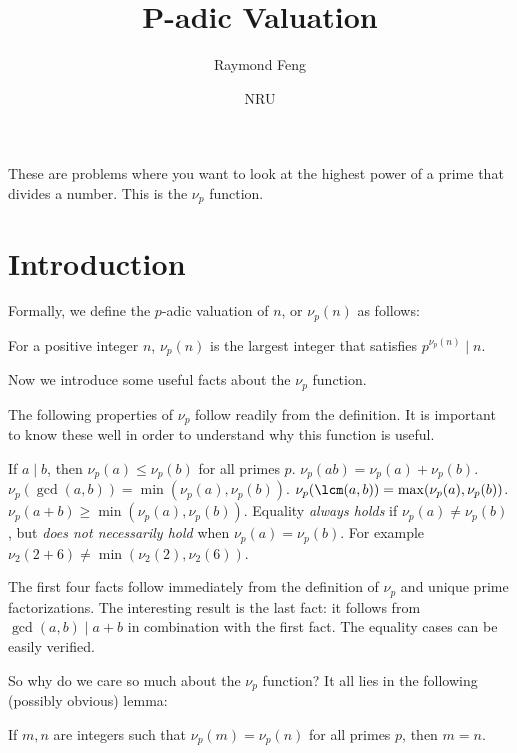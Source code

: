 \documentclass{article}
\title{P-adic Valuation}
\author{Raymond Feng}
\date{NRU}
\begin{document}
\maketitle

These are problems where you want to look at the highest power of a prime that divides a number. This is the $\nu_p$ function. 

\section{Introduction}
Formally, we define the $p$-adic valuation of $n$, or $\nu_p(n)$ as follows:
\begin{defi}
    For a positive integer $n$, $\nu_p(n)$ is the largest integer that satisfies $p^{\nu_p(n)}\mid n$.
\end{defi}

Now we introduce some useful facts about the $\nu_p$ function.

\begin{fact}[Properties of $\nu_p$]
    The following properties of $\nu_p$ follow readily from the definition. It is important to know these well in order to understand why this function is useful.
    \begin{itemize}
        \Item If $a\mid b$, then $\nu_p(a)\leq\nu_p(b)$ for all primes $p$.
        \Item $\nu_p(ab)=\nu_p(a)+\nu_p(b)$.
        \Item $\nu_p(\gcd(a,b))=\min(\nu_p(a),\nu_p(b))$.
        \Item $\nu_p(\lcm(a,b))=\max(\nu_p(a),\nu_p(b))$.
        \Item $\nu_p(a+b)\geq\min(\nu_p(a),\nu_p(b))$. Equality \emph{always holds} if $\nu_p(a)\neq\nu_p(b)$, but \emph{does not necessarily hold} when $\nu_p(a)=\nu_p(b)$. For example $\nu_2(2+6)\neq\min(\nu_2(2),\nu_2(6))$.
    \end{itemize}
\end{fact}

\begin{pro}
    The first four facts follow immediately from the definition of $\nu_p$ and unique prime factorizations. The interesting result is the last fact: it follows from $\gcd(a,b)\mid a+b$ in combination with the first fact. The equality cases can be easily verified.
\end{pro}

So why do we care so much about the $\nu_p$ function? It all lies in the following (possibly obvious) lemma:

\begin{lemma}
    If $m,n$ are integers such that $\nu_p(m)=\nu_p(n)$ for all primes $p$, then $m=n$.
\end{lemma}
\end{document}
